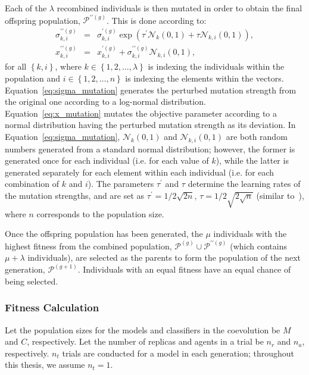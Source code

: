 Each of the $\lambda$ recombined individuals is then mutated in order to obtain the final offspring population, $\mathcal{P}^{\prime\prime \left(g\right)}$. This is done according to:
\begin{eqnarray}
\sigma_{k,i}^{\prime\prime \left(g\right)} & = & 
\sigma_{k,i}^{\prime\left(g\right)} \exp\left(\tau^{\prime} \mathcal{N}_{k}\left(0,1\right)
+ \tau \mathcal{N}_{k,i}\left(0,1\right) \right), \label{eq:sigma_mutation}\\
x_{k,i}^{\prime\prime \left(g\right)} & 
= & x_{k,i}^{\prime\left(g\right)} + \sigma_{k,i}^{\prime\prime \left(g\right)}
\mathcal{N}_{k,i} \left(0,1\right), \label{eq:x_mutation}
\end{eqnarray}
for all $\left\{k,i\right\}$, where $k\in\left\{1,2,\dots,\lambda\right\}$ is indexing the individuals within the population and $i\in\left\{1,2,\dots,n\right\}$ is indexing the elements within the vectors. Equation~\ref{eq:sigma_mutation} generates the perturbed mutation strength from the original one according to a log-normal distribution. Equation~\ref{eq:x_mutation} mutates the objective parameter according to a normal distribution having the perturbed mutation strength as its deviation. In Equation~\ref{eq:sigma_mutation}, $\mathcal{N}_{k}\left(0,1\right)$ and $\mathcal{N}_{k,i} \left(0,1\right)$ are both random numbers generated from a standard normal distribution; however, the former is generated once for each individual (i.e. for each value of $k$), while the latter is generated separately for each element within each individual (i.e. for each combination of $k$ and $i$). The parameters $\tau^{\prime}$ and $\tau$ determine the learning rates of the mutation strengths, and are set as $\tau^{\prime} = 1/2\sqrt{2n}$, $\tau = 1/2\sqrt{2\sqrt{n}}$ (similar to~\citep{Yao1999}), where $n$ corresponds to the population size.

Once the offspring population has been generated, the $\mu$ individuals with the highest fitness from the combined population, $\mathcal{P}^{\left(g\right)}\cup \mathcal{P}^{\prime\prime\left(g\right)}$ (which contains $\mu+\lambda$ individuals), are selected as the parents to form the population of the next generation, $\mathcal{P}^{\left(g+1\right)}$. Individuals with an equal fitness have an equal chance of being selected.

\subsubsection{Fitness Calculation}\label{sec:fitness_calculation_swarm}
Let the population sizes for the models and classifiers in the coevolution be $M$ and $C$, respectively. Let the number of replicas and agents in a trial be $n_r$ and $n_a$, respectively. $n_t$ trials are conducted for a model in each generation; throughout this thesis, we assume $n_t=1$.

